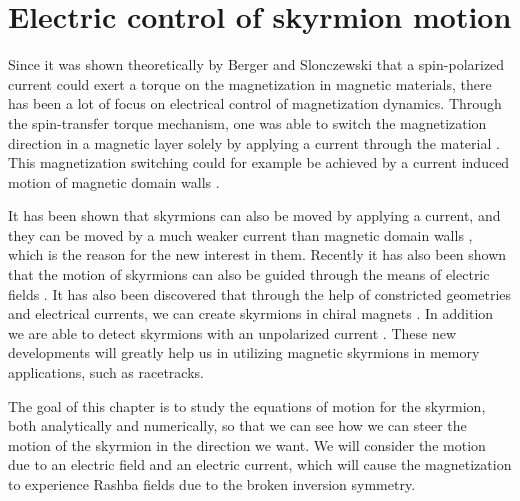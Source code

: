 \chapter{Electric control of skyrmion motion}
Since it was shown theoretically by Berger \cite{Berger1978,Berger1984,Berger1992,Berger1996} and Slonczewski \cite{Slonczewski1996} that a spin-polarized current could exert a torque on the magnetization in magnetic materials, there has been a lot of focus on electrical control of magnetization dynamics. Through the spin-transfer torque mechanism, one was able to switch the magnetization direction in a magnetic layer solely by applying a current through the material \cite{Myers1999,Sun1999,Katine2000}. This magnetization switching could for example be achieved by a current induced motion of magnetic domain walls \cite{Yamanouchi2004,Yamaguchi2004,Saitoh2004,Yamanouchi2006}. 

It has been shown that skyrmions can also be moved by applying a current, and they can be moved by a much weaker current than magnetic domain walls \cite{Jonietz2010,Yu2012}, which is the reason for the new interest in them. Recently it has also been shown that the motion of skyrmions can also be guided through the means of electric fields \cite{Upadhyaya2015}. It has also been discovered that through the help of constricted geometries and electrical currents, we can create skyrmions in chiral magnets \cite{Iwasaki2013,Sampaio2013,Jiang2015}. In addition we are able to detect skyrmions with an unpolarized current \cite{Monchesky2015}. These new developments will greatly help us in utilizing magnetic skyrmions in memory applications, such as racetracks. 

The goal of this chapter is to study the equations of motion for the skyrmion, both analytically and numerically, so that we can see how we can steer the motion of the skyrmion in the direction we want. We will consider the motion due to an electric field and an electric current, which will cause the magnetization to experience Rashba fields due to the broken inversion symmetry.
